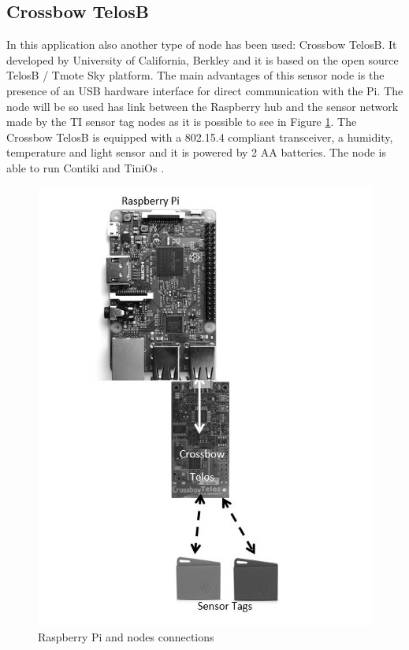\subsection{Crossbow TelosB}
In this application also another type of node has been used: Crossbow TelosB. It developed by University of California, Berkley and it is based on the open source TelosB / Tmote Sky platform. 
The main advantages of this sensor node is the presence of an USB hardware interface for direct communication with the Pi. The node will be so used has link between the Raspberry hub and the sensor network made by the TI sensor tag nodes as it is possible to see in Figure \ref{fig:Architecture}.
The Crossbow TelosB is equipped with a 802.15.4 compliant transceiver, a humidity, temperature and light sensor and it is powered by 2 AA batteries. The node is able to run Contiki and TiniOs \cite{TB}.\\
\begin{figure}[!h]
	\includegraphics[width=\linewidth]{Architecture}
	\caption{Raspberry Pi and nodes connections}
	\label{fig:Architecture}
\end{figure}



